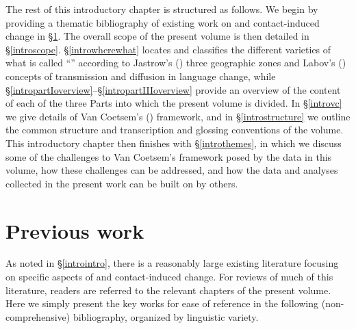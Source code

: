 \documentclass[output=paper]{langsci/langscibook}
\begin{document}
The rest of this introductory chapter is structured as follows. We begin by providing a thematic bibliography of existing work on  and contact-induced change in §\ref{introexistingwork}. The overall scope of the present volume is then detailed in §\ref{introscope}. §\ref{introwherewhat} locates and classifies the different varieties of what is called ``'' according to Jastrow's (\citeyear{Jastrow2002}) three geographic zones and Labov's (\citeyear{Labov2007}) concepts of {transmission} and {diffusion} in {language change}, while §\ref{intropartIoverview}--§\ref{intropartIIIoverview} provide an overview of the content of each of the three Parts into which the present volume is divided. In §\ref{introvc} we give details of Van Coetsem's (\citeyear{VanCoetsem1988,VanCoetsem2000}) framework, and in §\ref{introstructure} we outline the common structure and transcription and glossing conventions of the volume. This introductory chapter then finishes with §\ref{introthemes}, in which we discuss some of the challenges to Van Coetsem's framework posed by the data in this volume, how these challenges can be addressed, and how the data and analyses collected in the present work can be built on by others.


\section{Previous work}\label{introexistingwork}

As noted in §\ref{introintro}, there is a reasonably large existing literature {focusing} on specific aspects of  and contact-induced change. For reviews of much of this literature, readers are referred to the relevant chapters of the present volume. Here we simply present the key works for ease of reference in the following (non-comprehensive) bibliography, organized by linguistic variety.
\end{document}
